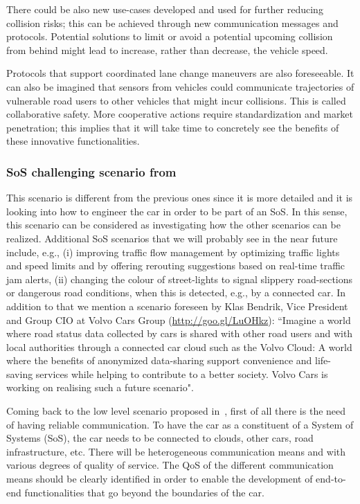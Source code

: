 There could be also new use-cases developed and used for further reducing collision risks; this can be achieved through new communication messages and protocols. 
Potential solutions to limit or avoid a potential upcoming collision from behind might lead to
increase, rather than decrease, the vehicle speed.

Protocols that support coordinated lane change maneuvers are also foreseeable. It can also be imagined that sensors from vehicles could communicate trajectories of vulnerable road users to other vehicles 
that might incur collisions.
This is called collaborative safety. More cooperative actions require %
standardization and market penetration; this implies that it will take time to concretely see the benefits of these innovative functionalities. %



\subsubsection{SoS challenging scenario from~\cite{JSA2017}}

This scenario is different from the previous ones since it is more detailed and it is looking into how to engineer the car in order to be part of an SoS. In this sense, this scenario can be considered as investigating how the other scenarios can be realized. Additional SoS scenarios that we will probably see in the near future include, e.g., (i) improving traffic flow management by optimizing traffic lights and speed limits and by offering rerouting
suggestions based on real-time traffic jam alerts, (ii) changing the colour of street-lights to signal slippery
road-sections or dangerous road conditions, when this is detected, e.g., by a connected car.
In addition to that we mention a scenario foreseen by Klas Bendrik, Vice President and Group CIO at Volvo Cars Group ({\footnotesize \url{http://goo.gl/LuOHkz}}): ``Imagine a world where road status data collected
by cars is shared with other road users and with local authorities through a connected car cloud such as the
Volvo Cloud: A world where the benefits of anonymized data-sharing support convenience and life-saving services
while helping to contribute to a better society. Volvo Cars is working on realising such a future scenario". 


Coming back to the low level scenario proposed in~\cite{JSA2017}, first of all there is the need of having reliable communication. To have the car as a constituent of a System of Systems (SoS), the car needs to be connected to clouds, other cars, road infrastructure, etc. There will be heterogeneous communication means and with various degrees of quality of service. The QoS of the different communication means should be clearly identified in order to enable the development of end-to-end functionalities that go beyond the boundaries of the car.

